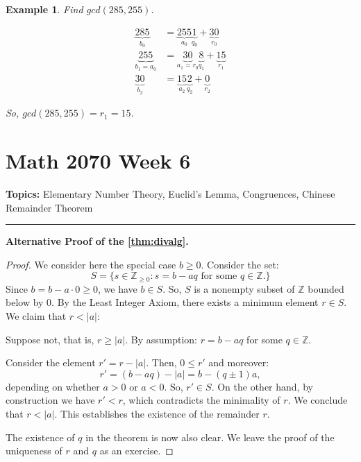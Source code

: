 \documentclass[a4paper,12pt]{report}
\newcommand{\abs}[1]{\left|#1\right|}
\newcommand{\class}[2]{#2}
\newcounter{statement}
\numberwithin{statement}{chapter}
\newtheorem{eg}[statement]{\bf Example}
\numberwithin{equation}{chapter}
\numberwithin{section}{chapter}
\numberwithin{subsection}{section}
\begin{document}
\begin{eg}
Find $gcd(285,255)$.





\[
\begin{split}
\underbrace{285}_{b_0} &= \underbrace{255}_{a_0} \underbrace{1}_{q_0} + \underbrace{30}_{r_0}
\\
\class{steps6 steps}{
\underbrace{255}_{b_1 = a_0}
}
&
\class{steps6 steps}{=\underbrace{30}_{a_1 = r_0} \underbrace{8}_{q_1} + \underbrace{15}_{r_1}}
\\
\class{steps6 steps}{\underbrace{30}_{b_2}}
&
\class{steps6 steps}{=\underbrace{15}_{a_2} \underbrace{2}_{q_2} + \underbrace{0}_{r_2}}
\end{split}
\]


So, $gcd(285, 255) = r_1 = 15$.

\end{eg}




\setcounter{chapter}{6}\setcounter{section}{0}
\setcounter{subsection}{0}
\setcounter{statement}{0}

\chapter*{Math 2070 Week 6}
{\bf Topics: }Elementary Number Theory, Euclid's Lemma, Congruences, Chinese Remainder Theorem
\hrule






\textbf{Alternative Proof of the \cref{thm:divalg}.}

\begin{proof}

We consider here the special case $b \geq 0$.
Consider the set:
\[
S = \{s \in \mathbb{Z}_{\geq 0 } : s = b - aq \text{ for some } q \in \mathbb{Z}.\}
\]
Since $b = b - a\cdot 0 \geq 0$, we have $b \in S$.
So, $S$ is a nonempty subset of $\mathbb{Z}$ bounded below by $0$.
By the Least Integer Axiom, there exists a minimum element $r \in S$.
We claim that $r < \abs{a}$:




Suppose not, that is, $r \geq \abs{a}$.  By assumption:
$r = b - aq$
for some $q \in \mathbb{Z}$.




Consider the element $r' = r - \abs{a}$.  Then, $0 \leq r'$ and moreover:
\[
r' = (b - aq) - \abs{a} = b - (q \pm 1)a,
\]
depending on whether $a > 0$ or $a < 0$.
So, $r' \in S$.  On the other hand, by construction we have $r' < r$,
which contradicts the minimality of $r$.  We conclude that $r < \abs{a}$.
This establishes the existence of the remainder $r$.




The existence of $q$ in the theorem is now also clear.  We leave the proof of the uniqueness of $r$ and $q$ as an exercise.
\end{proof}
\end{document}
